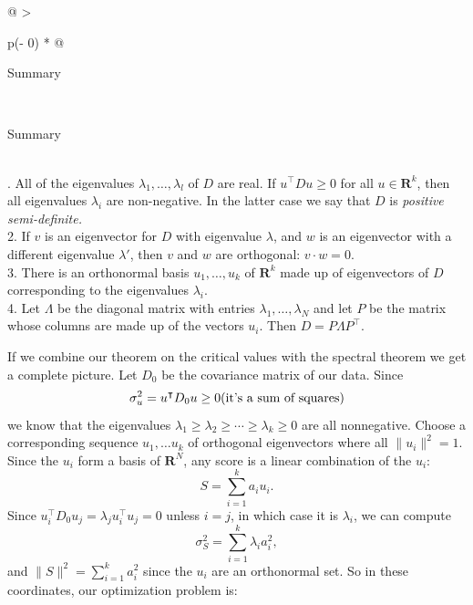 \documentclass[
  11pt,
  letterpaper,
]{scrbook}
\theoremstyle{plain}
\theoremstyle{remark}
\begin{document}
\hypertarget{tbl-symmmat}{}
\begin{longtable}[]{@{}
  >{\raggedright\arraybackslash}p{(\columnwidth - 0\tabcolsep) * }@{}}
\caption{\label{tbl-symmmat}Properties of Eigenvalues of Real Symmetric
Matrices}\tabularnewline
\toprule\noalign{}
\begin{minipage}[b]{\linewidth}\raggedright
Summary
\end{minipage} \\
\midrule\noalign{}
\endfirsthead
\toprule\noalign{}
\begin{minipage}[b]{\linewidth}\raggedright
Summary
\end{minipage} \\
\midrule\noalign{}
\endhead
\bottomrule\noalign{}
. All of the eigenvalues \(\lambda_{1},\ldots, \lambda_{l}\) of \(D\)
are real. If \(u^{\intercal}Du\ge 0\) for all \(u\in\mathbf{R}^{k}\),
then all eigenvalues \(\lambda_{i}\) are non-negative. In the latter
case we say that \(D\) is \emph{positive semi-definite.} \\
2. If \(v\) is an eigenvector for \(D\) with eigenvalue \(\lambda\), and
\(w\) is an eigenvector with a different eigenvalue \(\lambda'\), then
\(v\) and \(w\) are orthogonal: \(v\cdot w = 0\). \\
3. There is an orthonormal basis \(u_{1},\ldots, u_{k}\) of
\(\mathbf{R}^{k}\) made up of eigenvectors of \(D\) corresponding to the
eigenvalues \(\lambda_{i}\). \\
4. Let \(\Lambda\) be the diagonal matrix with entries
\(\lambda_{1},\ldots, \lambda_{N}\) and let \(P\) be the matrix whose
columns are made up of the vectors \(u_{i}\). Then
\(D = P\Lambda P^{\intercal}.\) \\
\end{longtable}

If we combine our theorem on the critical values with the spectral
theorem we get a complete picture. Let \(D_{0}\) be the covariance
matrix of our data. Since \[
\sigma_{u}^2 = u^{\intercal}D_{0}u\ge 0 \hbox{(it's a sum of squares)}
\] we know that the eigenvalues
\(\lambda_{1}\ge\lambda_{2}\ge \cdots \ge \lambda_{k}\ge 0\) are all
nonnegative. Choose a corresponding sequence \(u_{1},\ldots u_{k}\) of
orthogonal eigenvectors where all \(\|u_{i}\|^2=1\). Since the \(u_{i}\)
form a basis of \(\mathbf{R}^{N}\), any score is a linear combination of
the \(u_{i}\): \[
S = \sum_{i=1}^{k} a_{i}u_{i}.
\] Since
\(u_{i}^{\intercal}D_{0}u_{j} = \lambda_{j}u_{i}^{\intercal}u_{j} = 0\)
unless \(i=j\), in which case it is \(\lambda_{i}\), we can compute \[
\sigma_{S}^2 = \sum_{i=1}^{k} \lambda_{i}a_{i}^2,
\] and \(\|S\|^2=\sum_{i=1}^{k} a_{i}^2\) since the \(u_{i}\) are an
orthonormal set. So in these coordinates, our optimization problem is:
\end{document}

